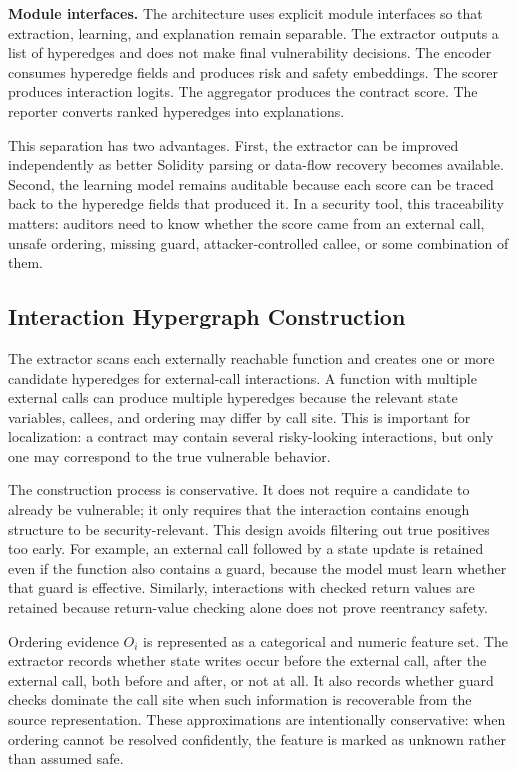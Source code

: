 \documentclass[conference]{IEEEtran}
\begin{document}
\textbf{Module interfaces.} The architecture uses explicit module interfaces so that extraction, learning, and explanation remain separable. The extractor outputs a list of hyperedges and does not make final vulnerability decisions. The encoder consumes hyperedge fields and produces risk and safety embeddings. The scorer produces interaction logits. The aggregator produces the contract score. The reporter converts ranked hyperedges into explanations.

This separation has two advantages. First, the extractor can be improved independently as better Solidity parsing or data-flow recovery becomes available. Second, the learning model remains auditable because each score can be traced back to the hyperedge fields that produced it. In a security tool, this traceability matters: auditors need to know whether the score came from an external call, unsafe ordering, missing guard, attacker-controlled callee, or some combination of them.

\subsection{Interaction Hypergraph Construction}

The extractor scans each externally reachable function and creates one or more candidate hyperedges for external-call interactions. A function with multiple external calls can produce multiple hyperedges because the relevant state variables, callees, and ordering may differ by call site. This is important for localization: a contract may contain several risky-looking interactions, but only one may correspond to the true vulnerable behavior.

The construction process is conservative. It does not require a candidate to already be vulnerable; it only requires that the interaction contains enough structure to be security-relevant. This design avoids filtering out true positives too early. For example, an external call followed by a state update is retained even if the function also contains a guard, because the model must learn whether that guard is effective. Similarly, interactions with checked return values are retained because return-value checking alone does not prove reentrancy safety.

Ordering evidence $O_i$ is represented as a categorical and numeric feature set. The extractor records whether state writes occur before the external call, after the external call, both before and after, or not at all. It also records whether guard checks dominate the call site when such information is recoverable from the source representation. These approximations are intentionally conservative: when ordering cannot be resolved confidently, the feature is marked as unknown rather than assumed safe.
\end{document}
